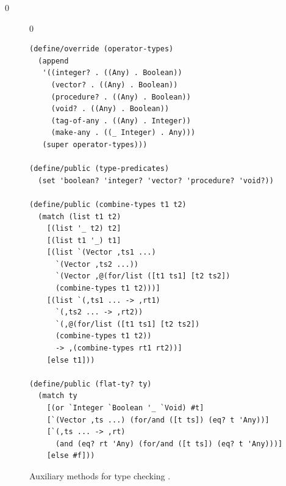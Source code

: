 \documentclass[7x10,nocrop]{TimesAPriori_MIT}%
\def\racketEd{0}
\def\edition{0}
\begin{document}
{\if\edition\racketEd
\begin{figure}[tbp]
{\if\edition\racketEd
\begin{lstlisting}
(define/override (operator-types)
  (append
   '((integer? . ((Any) . Boolean))
     (vector? . ((Any) . Boolean))
     (procedure? . ((Any) . Boolean))
     (void? . ((Any) . Boolean))
     (tag-of-any . ((Any) . Integer))
     (make-any . ((_ Integer) . Any)))
   (super operator-types)))

(define/public (type-predicates)
  (set 'boolean? 'integer? 'vector? 'procedure? 'void?))

(define/public (combine-types t1 t2)
  (match (list t1 t2)
    [(list '_ t2) t2]
    [(list t1 '_) t1]
    [(list `(Vector ,ts1 ...)
      `(Vector ,ts2 ...))
      `(Vector ,@(for/list ([t1 ts1] [t2 ts2])
      (combine-types t1 t2)))]
    [(list `(,ts1 ... -> ,rt1)
      `(,ts2 ... -> ,rt2))
      `(,@(for/list ([t1 ts1] [t2 ts2])
      (combine-types t1 t2))
      -> ,(combine-types rt1 rt2))]
    [else t1]))

(define/public (flat-ty? ty)
  (match ty
    [(or `Integer `Boolean '_ `Void) #t]
    [`(Vector ,ts ...) (for/and ([t ts]) (eq? t 'Any))]
    [`(,ts ... -> ,rt)
      (and (eq? rt 'Any) (for/and ([t ts]) (eq? t 'Any)))]
    [else #f]))
\end{lstlisting}
\fi}
\caption{Auxiliary methods for type checking \LangAny{}.}
\label{fig:type-check-Rany-aux}
\end{figure}
\fi}
\end{document}
